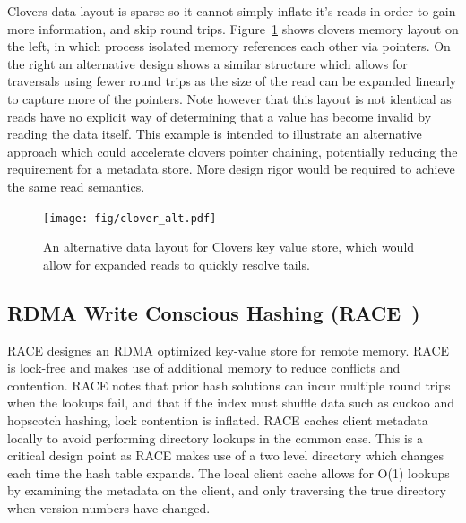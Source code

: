 Clovers data layout is sparse so it cannot simply inflate it's reads in order to
gain more information, and skip round trips. Figure~\ref{fig:clover_alt} shows
clovers memory layout on the left, in which process isolated memory references
each other via pointers. On the right an alternative design shows a similar
structure which allows for traversals using fewer round trips as the size of the
read can be expanded linearly to capture more of the pointers. Note however that
this layout is not identical as reads have no explicit way of determining that a
value has become invalid by reading the data itself. This example is intended to
illustrate an alternative approach which could accelerate clovers pointer
chaining, potentially reducing the requirement for a metadata store. More design
rigor would be required to achieve the same read semantics.


\begin{figure}
    \texttt{[image: fig/clover\_alt.pdf]}

    \caption{An alternative data layout for Clovers key value store, which would allow for expanded reads to quickly resolve tails.}
    \label{fig:clover_alt}
\end{figure}


\subsection{RDMA Write Conscious Hashing (RACE~\cite{one-sided-hash})}

RACE designes an RDMA optimized key-value store for remote memory. RACE is
lock-free and makes use of additional memory to reduce conflicts and contention.
RACE notes that prior hash solutions can incur multiple round trips when the
lookups fail, and that if the index must shuffle data such as cuckoo and
hopscotch hashing, lock contention is inflated. RACE caches client metadata
locally to avoid performing directory lookups in the common case. This is a
critical design point as RACE makes use of a two level directory which changes
each time the hash table expands. The local client cache allows for O(1) lookups
by examining the metadata on the client, and only traversing the true directory
when version numbers have changed.

